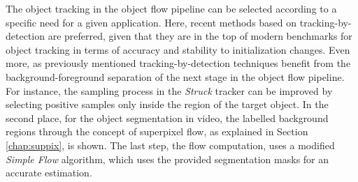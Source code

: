  The object tracking in the object flow pipeline can be selected according to a specific need for a given application. Here, recent methods based on tracking-by-detection are preferred, given that they are in the top of modern benchmarks for object tracking \cite{c16} in terms of accuracy and stability to initialization changes. Even more, as previously mentioned 
tracking-by-detection techniques benefit from the background-foreground separation of the next stage in the object flow pipeline. For instance, the sampling process in the {\it Struck} 
tracker can be improved by selecting positive samples only inside the region of the target object.
In the second place, for the object segmentation in video, the 
labelled background regions through the concept of superpixel flow, as explained in 
Section \ref{chap:suppix}, is shown. The last step, the flow computation, uses a modified 
{\it Simple Flow} algorithm, which uses the provided segmentation masks for an accurate estimation.



